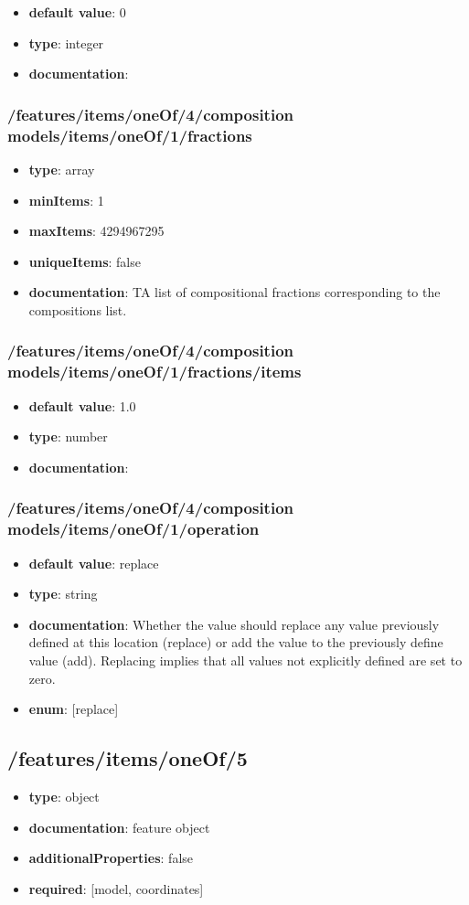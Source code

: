 \begin{itemize}\item {\bf default value}: 0
\item {\bf type}: integer
\item {\bf documentation}: 
\end{itemize}\subsubsection{/features/items/oneOf/4/composition models/items/oneOf/1/fractions}
\begin{itemize}\item {\bf type}: array
\item {\bf minItems}: 1
\item {\bf maxItems}: 4294967295
\item {\bf uniqueItems}: false
\item {\bf documentation}: TA list of compositional fractions corresponding to the compositions list.
\end{itemize}\subsubsection{/features/items/oneOf/4/composition models/items/oneOf/1/fractions/items}
\begin{itemize}\item {\bf default value}: 1.0
\item {\bf type}: number
\item {\bf documentation}: 
\end{itemize}\subsubsection{/features/items/oneOf/4/composition models/items/oneOf/1/operation}
\begin{itemize}\item {\bf default value}: replace
\item {\bf type}: string
\item {\bf documentation}: Whether the value should replace any value previously defined at this location (replace) or add the value to the previously define value (add). Replacing implies that all values not explicitly defined are set to zero.
\item {\bf enum}: [replace]\end{itemize}\subsection{/features/items/oneOf/5}
\begin{itemize}\item {\bf type}: object
\item {\bf documentation}: feature object
\item {\bf additionalProperties}: false
\item {\bf required}: [model, coordinates]\end{itemize}

